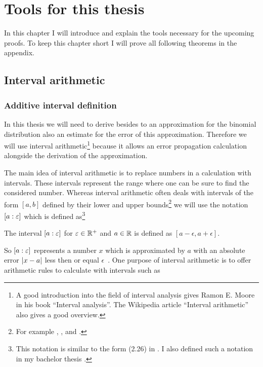 \chapter{Tools for this thesis} \label{chapter:tools}

In this chapter I will introduce and explain the tools necessary for the upcoming proofs. To keep this chapter short I will prove all following theorems in the appendix.

\section{Interval arithmetic}

\subsection{Additive interval definition}

In this thesis we will need to derive besides to an approximation for the binomial distribution also an estimate for the error of this approximation. Therefore we will use interval arithmetic\footnote{A good introduction into the field of interval analysis gives Ramon E. Moore in his book ``Interval analysis''\cite{moore}. The Wikipedia article ``Interval arithmetic''\cite{wikipedia:interval_arithmetic} also gives a good overview.} because it allows an error propagation calculation alongside the derivation of the approximation.

The main idea of interval arithmetic is to replace numbers in a calculation with intervals. These intervals represent the range where one can be sure to find the considered number. Whereas interval arithmetic often deals with intervals of the form $[a,b]$ defined by their lower and upper bounds\footnote{For example \cite[p.~5~ff.]{moore}, \cite[p.~9~ff.]{moore:methods}, \cite[p. 84 ff.]{kulisch} and \cite{wikipedia:interval_arithmetic}.} we will use the notation $\left[{a} : {\varepsilon}\right]$ which is defined as\footnote{This notation is similar to the form (2.26) in \cite[p. 14]{moore:methods}. I also defined such a notation in my bachelor thesis \cite[p. 19]{kulla}.}

\begin{definition}
  The interval $\left[{a} : {\varepsilon}\right]$ for $\varepsilon \in \mathbb R^{+}$ and $a\in \mathbb R$ is defined as $[a-\epsilon,a+\epsilon]$.
\end{definition}

So $\left[{a} : {\varepsilon}\right]$ represents a number $x$ which is approximated by $a$ with an absolute error $\left|{x-a}\right|$ less then or equal $\epsilon$~\cite[p.~5]{moore:methods}. One purpose of interval arithmetic is to offer arithmetic rules to calculate with intervals such as~\cite[pp.~19-20]{kulla}

